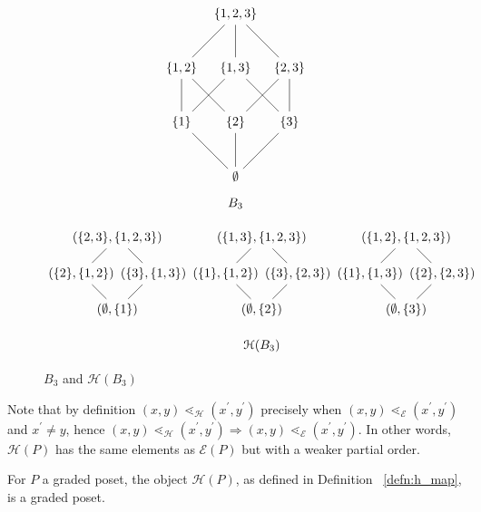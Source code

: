 \documentclass[smallextended]{svjour3}       %
\numberwithin{equation}{section}
\begin{document}
\begin{figure}[h!]
\[\begin{tikzpicture}[scale = 1.5]
  \node (0) at (0,0) {$\emptyset$};
  \node (1) at (-1,1) {$\{1\}$};
  \node (2) at (0,1) {$\{2\}$};
  \node (3) at (1,1) {$\{3\}$};
  \node (4) at (-1,2) {$\{1,2\}$};
  \node (5) at (0,2) {$\{1,3\}$};
  \node (6) at (1,2) {$\{2,3\}$};
  \node (7) at (0,3) {$\{1,2,3\}$};
  \draw (0)--(1);
  \draw (0)--(2);
  \draw (0)--(3);
  \draw (1)--(4);
  \draw (1)--(5);
  \draw (2)--(4);
  \draw (2)--(6);
  \draw (3)--(5);
  \draw (3)--(6);
  \draw (4)--(7);
  \draw (5)--(7);
  \draw (6)--(7);
  \node (8) at (0,-.5) {$B_3$};
\end{tikzpicture} \]

\vspace*{0.3in}

\[\begin{tikzpicture}[scale = 1]
  \node (0) at (0,0) {$(\emptyset,\{1\})$};
  \node (1) at (4,0) {$(\emptyset,\{2\})$};
  \node (2) at (8,0) {$(\emptyset,\{3\})$};
  \node (3) at (3,1) {$(\{1\},\{1,2\})$};
  \node (4) at (7,1) {$(\{1\},\{1,3\})$};
  \node (5) at (-1,1) {$(\{2\},\{1,2\})$};
  \node (6) at (9,1) {$(\{2\},\{2,3\})$};
  \node (7) at (1,1) {$(\{3\},\{1,3\})$};
  \node (8) at (5,1) {$(\{3\},\{2,3\})$};
  \node (9) at (8,2) {$(\{1,2\},\{1,2,3\})$};
  \node (10) at (4,2) {$(\{1,3\},\{1,2,3\})$};
  \node (11) at (0,2) {$(\{2,3\},\{1,2,3\})$};
  \draw (0)--(5)--(11)--(7)--(0);
  \draw (1)--(3)--(10)--(8)--(1);
  \draw (2)--(4)--(9)--(6)--(2);
  \node (12) at (4,-1) {$\mathcal{H}(B_3)$};
\end{tikzpicture}\]
\caption{\label{fig:3boolean} $B_3$ and $\mathcal H (B_3)$}
\end{figure}


\begin{remark}\label{rem:order_containment}
Note that by definition $(x,y)\lessdot_{\mathcal{H}} (x^\prime,y^\prime)$ precisely when $(x,y)\lessdot_{\mathcal{E}} (x^\prime,y^\prime)$ and $x^\prime\neq y$, hence $(x, y)\lessdot_{\mathcal{H}} (x^\prime, y^\prime) \Rightarrow (x, y)\lessdot_{\mathcal E} (x^\prime, y^\prime)$.  In other words, $\mathcal{H}(P)$ has the same elements as $\mathcal{E}(P)$ but with a weaker partial order.
\end{remark}


\begin{lemma}\label{lem:HP_order}
For $P$ a graded poset, the object $\mathcal{H}(P)$, as defined in Definition ~\ref{defn:h_map}, is a graded poset.
\end{lemma}
\end{document}
